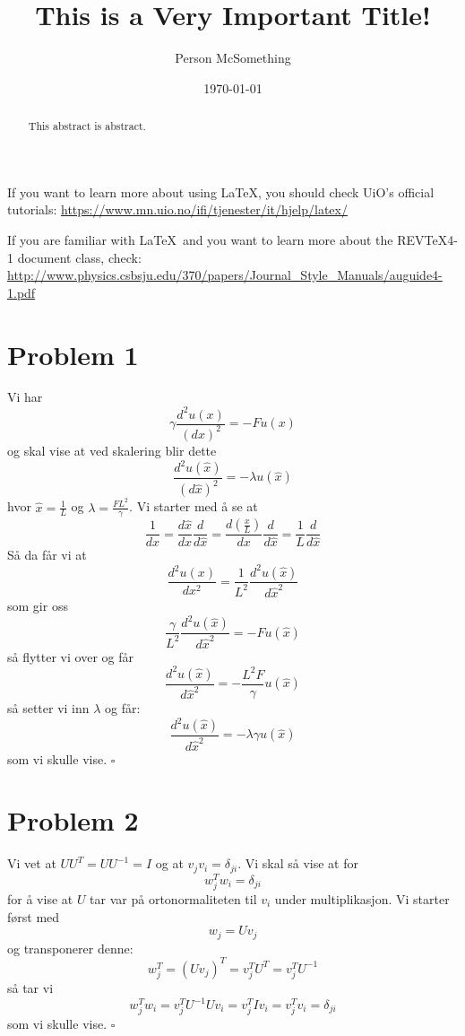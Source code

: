 \documentclass[reprint,english,notitlepage]{revtex4-1}  %
\begin{document}
\title{This is a Very Important Title!}   %
\author{Person McSomething}               %
\date{\today}                             %
\noaffiliation                            %
\begin{abstract}                          %
This abstract is abstract.                %
\end{abstract}                            %
\maketitle                                %

If you want to learn more about using \LaTeX, you should check UiO's official tutorials:
\url{https://www.mn.uio.no/ifi/tjenester/it/hjelp/latex/}

If you are familiar with \LaTeX\ and you want to learn more about the REVTeX4-1 document class, check:
\url{http://www.physics.csbsju.edu/370/papers/Journal_Style_Manuals/auguide4-1.pdf}


\section*{Problem 1}
Vi har
$$
\gamma \frac{d^2u(x)}{(dx)^2}=-Fu(x)
$$
og skal vise at ved skalering blir dette
$$
\frac{d^2u(\hat{x})}{(d\hat{x})^2}=-\lambda u(\hat{x})
$$
hvor $\hat{x}=\frac{1}{L}$ og $\lambda=\frac{FL^2}{\gamma}$.
\newline Vi starter med å se at
$$
\frac{1}{dx}=\frac{d\hat{x}}{dx}\frac{d}{d\hat{x}}=\frac{d(\frac{x}{L})}{dx}\frac{d}{d\hat{x}}=\frac{1}{L}\frac{d}{d\hat{x}}
$$
Så da får vi at
$$
\frac{d^2u(x)}{dx^2}=\frac{1}{L^2}\frac{d^2u(\hat{x})}{d\hat{x}^2}
$$
som gir oss 
$$
\frac{\gamma}{L^2}\frac{d^2u(\hat{x})}{d\hat{x}^2}=-Fu(\hat{x})
$$
så flytter vi over og får
$$
\frac{d^2u(\hat{x})}{d\hat{x}^2}=-\frac{L^2  F}{\gamma}u(\hat{x})
$$
så setter vi inn $\lambda$ og får:
$$
\frac{d^2u(\hat{x})}{d\hat{x}^2}=-\lambda{\gamma}u(\hat{x})
$$
som vi skulle vise. $\square$
\section{Problem 2}
Vi vet at $UU^T=UU^{-1}=I$ og at $v_jv_i=\delta_{ji}$. Vi skal så vise at for 
$$
w_j^Tw_i=\delta_{ji}
$$
for å vise at $U$ tar var på ortonormaliteten til $v_i$ under multiplikasjon.
\newline Vi starter først med
$$
w_j=Uv_j
$$
og transponerer denne:
$$
w_j^T=(Uv_j)^T=v_j^TU^T=v_j^TU^{-1}
$$
så tar vi
$$
w_j^Tw_i=v_j^TU^{-1}Uv_i=v_j^TIv_i=v_j^Tv_i=\delta_{ji}
$$
som vi skulle vise. $\square$
\end{document}
